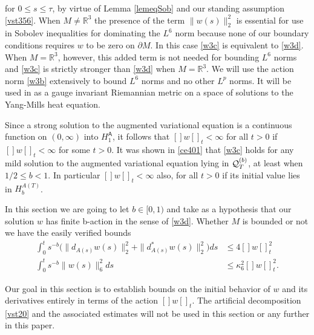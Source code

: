 \documentclass[12pt]{article}
\def \R{\mathbb R}
\def \As{\mathsf{A}}
\def \Q{{\cal Q}}
\def \p{\partial}
\def \nn{[]}
\def \eref{\eqref}
\numberwithin{equation}{section}
\begin{document}
for $0 \le s \le \tau$,
  by virtue of Lemma \ref{lemeqSob} and our standing assumption \eref{vst356}.
    When $M \ne \R^3$ the presence
   of the term $\|w(s)\|_2^2$  is essential for use in Sobolev inequalities for 
    dominating the $L^6$ norm  because 
   none   of our boundary conditions   requires $w$ to be zero on $\p M$. 
   In this case \eref{w3c} is equivalent to \eref{w3d}. 
   When $M = \R^3$, however,
  this added term is not needed for bounding $L^6$ norms and \eref{w3c} is strictly
   stronger than \eref{w3d} when $M =\R^3$. 
 We will use the action norm  \eref{w3b}  extensively to bound $L^6$ norms and no other  $L^p$ norms.
  It will be used  in \cite{G72} as a gauge invariant Riemannian metric on a space of
  solutions to the  Yang-Mills heat equation. 
  

            Since a strong solution to the augmented variational equation is a continuous function on $(0, \infty)$
into $H_1^\As$, it follows that $\nn w\nn_t < \infty$ for all $t>0$ if   $\nn w\nn_t < \infty$ for some $t >0$.
  It was shown in \eref{ce401} that \eref{w3c} holds for any mild solution to the augmented variational
equation  lying in $\Q_T^{(b)}$, at least when $1/2 \le b <1$. In particular $\nn w\nn _t <\infty$ also,
for all $t >0$ if its initial value lies in $H_b^{A(T)}$.
 

              In this section   we are going to let $b \in [0, 1)$ and take as a hypothesis that
  our  solution $w$ has finite b-action   in the sense  of \eref{w3d}.     
   Whether $M$ is bounded or not we have the easily verified bounds
  \begin{align}
  \int_0^t s^{-b}\Big(\|d_{A(s)} w(s)\|_2^2 + \| d_{A(s)}^* w(s)\|_2^2\Big) ds &\le 4 \nn w\nn_t^2  \label{ib5a}\\
  \int_0^t s^{-b} \|w(s)\|_6^2 ds &\le \kappa_6^2 \nn w\nn_t^2.  \label{ib6a}
  \end{align}
  


  Our goal in this section is to establish bounds on the initial behavior of $w$
 and its derivatives
entirely in terms of the action $\nn w\nn_t$. The artificial decomposition \eref{vst20} 
and the associated estimates
will not be used in this section or any further  in this paper.
\end{document}
